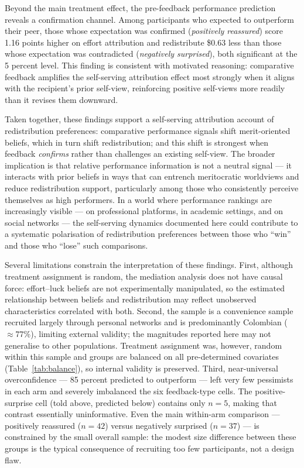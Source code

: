 \documentclass[12pt]{article}
\begin{document}
Beyond the main treatment effect, the pre-feedback performance prediction
reveals a confirmation channel.
Among participants who expected to outperform their peer, those whose
expectation was confirmed (\emph{positively reassured}) score 1.16 points
higher on effort attribution and redistribute \$0.63 less than those whose
expectation was contradicted (\emph{negatively surprised}), both significant
at the 5 percent level.
This finding is consistent with motivated reasoning: comparative feedback
amplifies the self-serving attribution effect most strongly when it aligns
with the recipient's prior self-view, reinforcing positive self-views more
readily than it revises them downward.

Taken together, these findings support a self-serving attribution account of
redistribution preferences: comparative performance signals shift
merit-oriented beliefs, which in turn shift redistribution; and this shift is
strongest when feedback \emph{confirms} rather than challenges an existing
self-view.
The broader implication is that relative performance information is not a
neutral signal --- it interacts with prior beliefs in ways that can entrench
meritocratic worldviews and reduce redistribution support, particularly among
those who consistently perceive themselves as high performers.
In a world where performance rankings are increasingly visible --- on
professional platforms, in academic settings, and on social networks ---
the self-serving dynamics documented here could contribute to a systematic
polarisation of redistribution preferences between those who ``win'' and
those who ``lose'' such comparisons.

Several limitations constrain the interpretation of these findings.
First, although treatment assignment is random, the mediation analysis does
not have causal force: effort--luck beliefs are not experimentally
manipulated, so the estimated relationship between beliefs and redistribution
may reflect unobserved characteristics correlated with both.
Second, the sample is a convenience sample recruited largely through personal
networks and is predominantly Colombian ($\approx 77$\%), limiting external
validity; the magnitudes reported here may not generalise to other
populations.
Treatment assignment was, however, random within this sample and groups are
balanced on all pre-determined covariates (Table~\ref{tab:balance}), so
internal validity is preserved.
Third, near-universal overconfidence --- 85 percent predicted to outperform
--- left very few pessimists in each arm and severely imbalanced the six
feedback-type cells.
The positive-surprise cell (told above, predicted below) contains only $n=5$,
making that contrast essentially uninformative.
Even the main within-arm comparison --- positively reassured ($n = 42$)
versus negatively surprised ($n = 37$) --- is constrained by the small
overall sample: the modest size difference between these groups is the
typical consequence of recruiting too few participants, not a design flaw.
\end{document}
